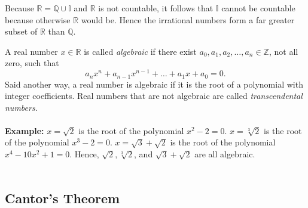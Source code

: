 \documentclass{article}
\begin{document}
            Because $\mathbb{R} = \mathbb{Q} \cup \mathbb{I}$ and $\mathbb{R}$ is not countable, it follows that $\mathbb{I}$ cannot be countable because otherwise $\mathbb{R}$ would be. Hence the irrational numbers form a far greater subset of $\mathbb{R}$ than $\mathbb{Q}$.
            
            A real number $x \in \mathbb{R}$ is called \textit{algebraic} if there exist $a_0,a_1,a_2,\dots,a_n \in \mathbb{Z}$, not all zero, such that
            \begin{equation*}
                a_nx^n + a_{n-1}x^{n-1}+\dots+a_1x+a_0 = 0.
            \end{equation*}
            Said another way, a real number is algebraic if it is the root of a polynomial with integer coefficients. Real numbers that are not algebraic are called \textit{transcendental numbers}.\\ \\
            \textbf{Example:} $x = \sqrt{2}$ is the root of the polynomial $x^2-2=0$. $x = \sqrt[3]{2}$ is the root of the polynomial $x^3-2=0$. $x=\sqrt{3}+\sqrt{2}$ is the root of the polynomial $x^4-10x^2+1=0$. Hence, $\sqrt{2},\sqrt[3]{2}$, and $\sqrt{3}+\sqrt{2}$ are all algebraic.\\ \\
            
        
        \subsection{Cantor's Theorem}
\end{document}
